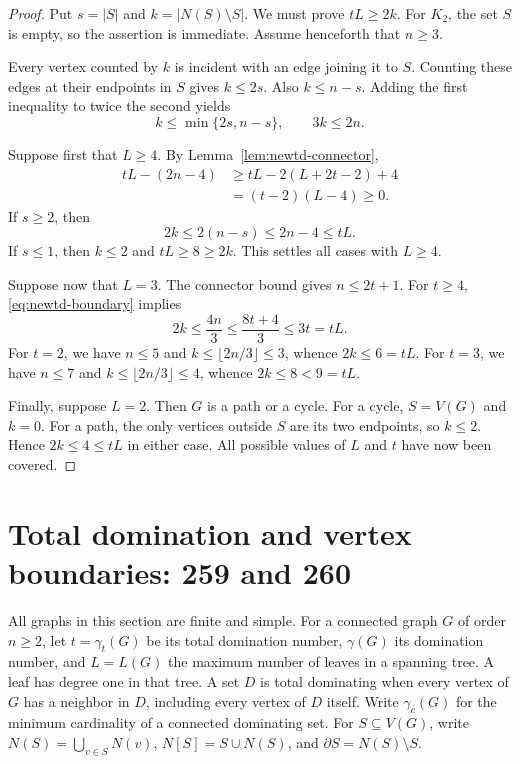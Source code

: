 \documentclass[11pt,a4paper]{article}
\theoremstyle{remark}
\begin{document}
\begin{proof}
Put $s=|S|$ and $k=|N(S)\setminus S|$. We must prove $tL\geq 2k$.
For $K_2$, the set $S$ is empty, so the assertion is immediate.
Assume henceforth that $n\geq 3$.

Every vertex counted by $k$ is incident with an edge joining it to $S$.
Counting these edges at their endpoints in $S$ gives $k\leq 2s$.
Also $k\leq n-s$. Adding the first inequality to twice the second yields
\begin{equation}
\label{eq:newtd-boundary}
 k\leq\min\{2s,n-s\},\qquad 3k\leq 2n.
\end{equation}

Suppose first that $L\geq 4$. By Lemma~\ref{lem:newtd-connector},
\begin{align*}
 tL-(2n-4)
 &\geq tL-2(L+2t-2)+4\\
 &= (t-2)(L-4)\geq 0.
\end{align*}
If $s\geq 2$, then
\[
 2k\leq 2(n-s)\leq 2n-4\leq tL.
\]
If $s\leq 1$, then $k\leq 2$ and $tL\geq 8\geq 2k$.
This settles all cases with $L\geq 4$.

Suppose now that $L=3$. The connector bound gives $n\leq 2t+1$.
For $t\geq 4$, \eqref{eq:newtd-boundary} implies
\[
 2k\leq\frac{4n}{3}\leq\frac{8t+4}{3}\leq 3t=tL.
\]
For $t=2$, we have $n\leq 5$ and
$k\leq\lfloor 2n/3\rfloor\leq 3$, whence $2k\leq 6=tL$.
For $t=3$, we have $n\leq 7$ and
$k\leq\lfloor 2n/3\rfloor\leq 4$, whence $2k\leq 8<9=tL$.

Finally, suppose $L=2$. Then $G$ is a path or a cycle. For a cycle,
$S=V(G)$ and $k=0$. For a path, the only vertices outside $S$ are its
two endpoints, so $k\leq 2$. Hence $2k\leq 4\leq tL$ in either case.
All possible values of $L$ and $t$ have now been covered.
\end{proof}
\section{Total domination and vertex boundaries: 259 and 260}
\label{r3td:section}

All graphs in this section are finite and simple. For a connected graph
$G$ of order $n\ge2$, let $t=\gamma_t(G)$ be its total domination number,
$\gamma(G)$ its domination number, and $L=L(G)$ the maximum number of
leaves in a spanning tree. A leaf has degree one in that tree. A set $D$
is total dominating when every vertex of $G$ has a neighbor in $D$,
including every vertex of $D$ itself. Write $\gamma_c(G)$ for the minimum
cardinality of a connected dominating set. For $S\subseteq V(G)$, write
$N(S)=\bigcup_{v\in S}N(v)$, $N[S]=S\cup N(S)$, and
$\partial S=N(S)\setminus S$.
\end{document}
